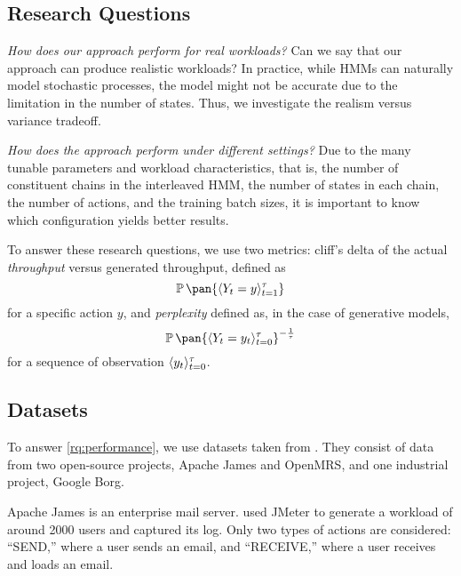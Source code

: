 \subsection{Research Questions}

\begin{researchquestions}
    \item\label{rq:performance} \emph{How does our approach perform for real workloads?} Can we say that our approach can produce realistic workloads? In practice, while HMMs can naturally model stochastic processes, the model might not be accurate due to the limitation in the number of states. Thus, we investigate the realism versus variance tradeoff.
    \item\label{rq:ablation} \emph{How does the approach perform under different settings?} Due to the many tunable parameters and workload characteristics, that is, the number of constituent chains in the interleaved HMM, the number of states in each chain, the number of actions, and the training batch sizes, it is important to know which configuration yields better results.
\end{researchquestions}

To answer these research questions, we use two metrics: cliff's delta\cite{Cliff1993-he} of the actual \emph{throughput} versus generated throughput, defined as
\begin{equation}
    \prob\pan{\seq{Y_t = y}_{t=1}^\tau}
\end{equation}
for a specific action \(y\), and \emph{perplexity} defined as, in the case of generative models,
\begin{equation}
    \prob\pan{\seq{Y_t = y_t}_{t=0}^{\tau}}^{-\frac{1}{\tau}}
\end{equation}
for a sequence of observation \(\langle y_t\rangle_{t=0}^\tau\).

\subsection{Datasets}\label{sec:dataset}

To answer \cref{rq:performance}, we use datasets taken from \cite{Chen2019-fu}. They consist of data from two open-source projects, Apache James and OpenMRS, and one industrial project, Google Borg.

Apache James is an enterprise mail server. \cite{Chen2019-fu} used JMeter to generate a workload of around 2000 users and captured its log. Only two types of actions are considered: ``SEND,'' where a user sends an email, and ``RECEIVE,'' where a user receives and loads an email.

